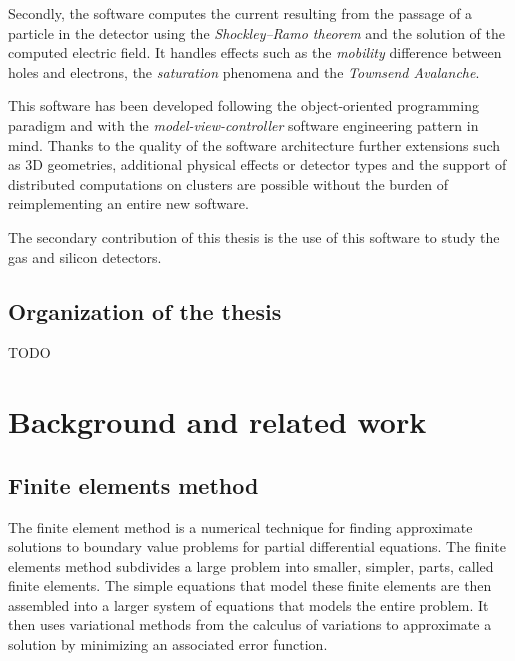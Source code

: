 \documentclass[11pt]{article}
\begin{document}
	Secondly, the software computes the current resulting from the passage of a particle
	in the detector using the \textit{Shockley–Ramo theorem} and the solution of the
	computed electric field. It handles effects such as the \textit{mobility}
	difference between holes and electrons, the \textit{saturation} phenomena and the
	\textit{Townsend Avalanche}.

	This software has been developed following the object-oriented
	programming paradigm and with the \textit{model-view-controller}
	software engineering pattern in mind. Thanks to the quality of the software
	architecture further extensions such as 3D geometries, additional physical effects or
	detector types and the support of distributed computations on clusters are possible
	without the burden of reimplementing an entire new software.

	The secondary contribution of this thesis is the use of this software to study
	the gas and silicon detectors.


	\subsection*{Organization of the thesis}

	TODO



\section{Background and related work}

	\subsection{Finite elements method}

		The finite element method is a numerical technique for
		finding approximate solutions to boundary value problems for partial
		differential equations. The finite elements method subdivides a large
		problem into smaller, simpler, parts, called finite elements. The
		simple equations that model these finite elements are then assembled
		into a larger system of equations that models the entire problem. It
		then uses variational methods from the calculus of variations to
		approximate a solution by minimizing an associated error function.
\end{document}
